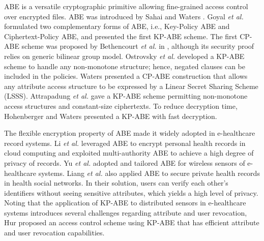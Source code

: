 \documentclass[twocolumn]{svjour3}          \smartqed  \usepackage{graphicx}
\begin{document}
ABE is a versatile cryptographic primitive allowing fine-grained access control over encrypted files.  ABE was introduced by Sahai and Waters
\cite{SW05}. Goyal {\it et al.} \cite{GPS+06} formulated two complementary forms of ABE, i.e., Key-Policy ABE and Ciphertext-Policy ABE, and presented the first
KP-ABE scheme. The first CP-ABE scheme was proposed by Bethencourt {\it et al.} in \cite{BSW07}, although its security proof relies on generic bilinear group
model. Ostrovsky {\it et al.} \cite{OSW07} developed a KP-ABE scheme to handle any non-monotone structure; hence, negated clauses can be included in the
policies. Waters \cite{Wat11} presented a CP-ABE construction that allows any attribute access structure to be expressed by a Linear Secret Sharing Scheme
(LSSS). Attrapadung {\it et al.} \cite{ALP11} gave a KP-ABE scheme
permitting non-monotone access structures and constant-size ciphertexts.
To reduce
decryption time, Hohenberger and Waters \cite{HW13} presented a KP-ABE with fast decryption.


The flexible encryption property of ABE made it widely adopted in e-healthcare record systems. Li {\it et al.} \cite{LYZ+13} leveraged ABE to encrypt personal health records in cloud computing and exploited multi-authority ABE to achieve a high degree of privacy of records. Yu {\it et al.} \cite{YRL11} adopted and tailored ABE for wireless sensors of e-healthcare systems. Liang {\it et al.} \cite{LBL+12} also applied ABE to secure private health records in health social networks. In their solution, users can verify
each other's identifiers  without seeing sensitive attributes, which yields a high level of privacy. Noting that the application of KP-ABE to distributed sensors in e-healthcare systems introduces several challenges regarding attribute and user revocation, Hur \cite{Hur11} proposed an access control scheme using KP-ABE that has efficient attribute and user revocation capabilities.
\end{document}
